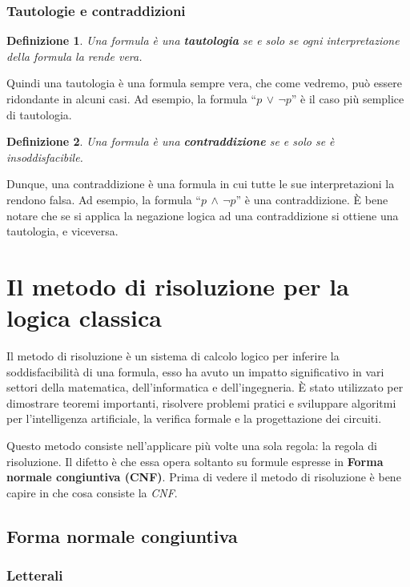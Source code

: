 \documentclass[a4paper,12pt]{report}
\newtheorem{definition}{Definizione}[section]
\begin{document}
\subsection{Tautologie e contraddizioni}
\label{taut-contr}
\begin{definition}
    Una formula è una \textbf{tautologia} se e solo se ogni interpretazione della formula la rende vera.
\end{definition}
Quindi una tautologia è una formula sempre vera, che come vedremo, può essere ridondante in alcuni casi. Ad esempio, la formula ``$p \, \lor \, \lnot p$'' è il caso più semplice di tautologia.

\begin{definition}
    Una formula è una \textbf{contraddizione} se e solo se è insoddisfacibile.
\end{definition}
Dunque, una contraddizione è una formula in cui tutte le sue interpretazioni la rendono falsa. Ad esempio, la formula ``$p \, \land \, \lnot p$'' è una contraddizione. \`E bene notare che se si applica la negazione logica ad una contraddizione si ottiene una tautologia, e viceversa.

% 
% 
\chapter{Il metodo di risoluzione per la logica classica}
\label{resol}
Il metodo di risoluzione è un sistema di calcolo logico per inferire la soddisfacibilità di una formula, esso ha avuto un impatto significativo in vari settori della matematica, dell'informatica e dell'ingegneria. È stato utilizzato per dimostrare teoremi importanti, risolvere problemi pratici e sviluppare algoritmi per l'intelligenza artificiale, la verifica formale e la progettazione dei circuiti. 

Questo metodo consiste nell'applicare più volte una sola regola: la regola di risoluzione. Il difetto è che essa opera soltanto su formule espresse in \textbf{Forma normale congiuntiva (CNF)}. Prima di vedere il metodo di risoluzione è bene capire in che cosa consiste la \emph{CNF}.

\section{Forma normale congiuntiva}
\label{CNF}
\subsection{Letterali}
\end{document}
